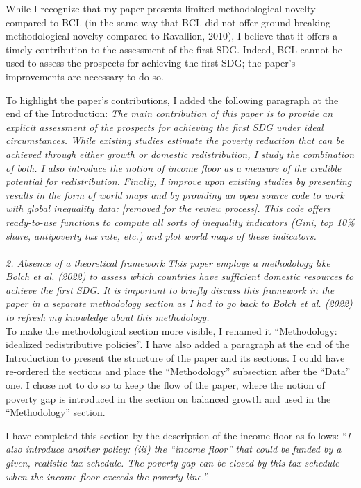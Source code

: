 \documentclass[12pt,english]{article}
\begin{document}
While I recognize that my paper presents limited methodological novelty compared to BCL (in the same way that BCL did not offer ground-breaking methodological novelty compared to Ravallion, 2010), I believe that it offers a timely contribution to the assessment of the first SDG. Indeed, BCL cannot be used to assess the prospects for achieving the first SDG; the paper's improvements are necessary to do so. 

To highlight the paper's contributions, I added the following paragraph at the end of the Introduction: \textit{The main contribution of this paper is to provide an explicit assessment of the prospects for achieving the first SDG under ideal circumstances. While existing studies estimate the poverty reduction that can be achieved through either growth or domestic redistribution, I study the combination of both. I also introduce the notion of \textit{income floor} as a measure of the credible potential for redistribution. Finally, I improve upon existing studies by presenting results in the form of world maps and by providing an open source code to work with global inequality data: [\textit{removed for the review process}]. This code offers ready-to-use functions to compute all sorts of inequality indicators (Gini, top 10\% share, antipoverty tax rate, etc.) and plot world maps of these indicators.}
~\\ ~\\

\textit{2.	Absence of a theoretical framework}
\textit{This paper employs a methodology like Bolch et al. (2022) to assess which countries have sufficient domestic resources to achieve the first SDG. It is important to briefly discuss this framework in the paper in a separate methodology section as I had to go back to Bolch et al. (2022) to refresh my knowledge about this methodology. }~\\

To make the methodological section more visible, I renamed it ``Methodology: idealized redistributive policies''. I have also added a paragraph at the end of the Introduction to present the structure of the paper and its sections. I could have re-ordered the sections and place the ``Methodology'' subsection after the ``Data'' one. I chose not to do so to keep the flow of the paper, where the notion of poverty gap is introduced in the section on balanced growth and used in the ``Methodology'' section.

I have completed this section by the description of the income floor as follows: ``\textit{I also introduce another policy: (iii) the ``income floor'' that could be funded by a given, realistic tax schedule. The poverty gap can be closed by this tax schedule when the income floor exceeds the poverty line.}'' 
\end{document}
